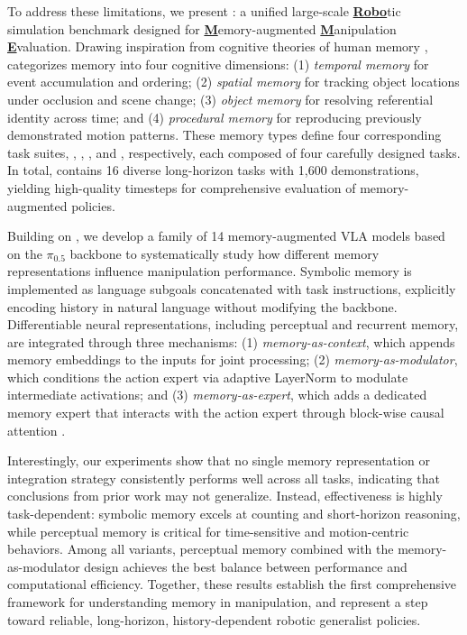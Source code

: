 To address these limitations, we present \textbf{\benchname}: a unified large-scale \underline{\textbf{Robo}}tic simulation benchmark designed for \underline{\textbf{M}}emory-augmented \underline{\textbf{M}}anipulation \underline{\textbf{E}}valuation.
Drawing inspiration from cognitive theories of human memory \cite{atkinson1968human}, \benchname\xspace categorizes memory into four cognitive dimensions: (1) \textit{temporal memory} for event accumulation and ordering; (2) \textit{spatial memory} for tracking object locations under occlusion and scene change; (3) \textit{object memory} for resolving referential identity across time; and (4) \textit{procedural memory} for reproducing previously demonstrated motion patterns. These memory types define four corresponding task suites, \TSone, \TStwo, \TSthree, and \TSfour, respectively, each composed of four carefully designed tasks. In total, \benchname\xspace contains 16 diverse long-horizon tasks with 1,600 demonstrations, yielding \trainsteps\xspace high-quality timesteps for comprehensive evaluation of memory-augmented policies.

Building on \benchname, we develop a family of 14 memory-augmented VLA models based on the $\pi_{0.5}$ backbone \cite{pi05} to systematically study how different memory representations influence manipulation performance.
Symbolic memory is implemented as language subgoals concatenated with task instructions, explicitly encoding history in natural language without modifying the backbone.
Differentiable neural representations, including perceptual and recurrent memory, are integrated through three mechanisms:
(1) \textit{memory-as-context}, which appends memory embeddings to the inputs for joint processing;
(2) \textit{memory-as-modulator}, which conditions the action expert via adaptive LayerNorm  \cite{peebles2023scalable} to modulate intermediate activations; and
(3) \textit{memory-as-expert}, which adds a dedicated memory expert that interacts with the action expert through block-wise causal attention \cite{pi0}.

Interestingly, our experiments show that no single memory representation or integration strategy consistently performs well across all tasks, indicating that conclusions from prior work may not generalize. Instead, effectiveness is highly task-dependent: symbolic memory excels at counting and short-horizon reasoning, while perceptual memory is critical for time-sensitive and motion-centric behaviors. Among all variants, perceptual memory combined with the memory-as-modulator design achieves the best balance between performance and computational efficiency. Together, these results establish the first comprehensive framework for understanding memory in manipulation, and represent a step toward reliable, long-horizon, history-dependent robotic generalist policies.
